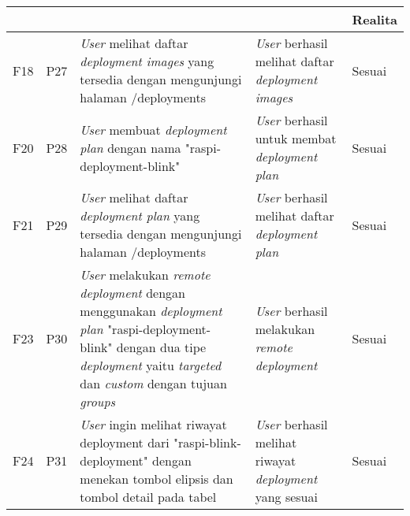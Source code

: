\bgroup
\begin{table}[ht]
  \def\arraystretch{1.3}
  \centering
  \begin{tabular}{|p{2cm}|p{2cm}|p{3cm}|p{3cm}|p{1.5cm}|}
    \hline
    \centering{ID Fungsional} & \centering{ID Pengujian} & \centering{Skenario}                                                                                                                                                                                                                  & \centering{Ekspektasi}                                                 & Realita \\
    \hline

    F18                       & P27                      & \textit{User} melihat daftar \textit{deployment images} yang tersedia dengan mengunjungi halaman /deployments                                                                                                                         & \textit{User} berhasil melihat daftar \textit{deployment images}       & Sesuai  \\
    \hline
    F20                       & P28                      & \textit{User} membuat \textit{deployment plan} dengan nama "raspi-deployment-blink"                                                                                                                                                   & \textit{User} berhasil untuk membat \textit{deployment plan}           & Sesuai  \\
    \hline
    F21                       & P29                      & \textit{User} melihat daftar \textit{deployment plan} yang tersedia dengan mengunjungi halaman /deployments                                                                                                                           & \textit{User} berhasil melihat daftar \textit{deployment plan}         & Sesuai  \\
    \hline
    F23                       & P30                      & \textit{User} melakukan \textit{remote deployment} dengan menggunakan \textit{deployment plan} "raspi-deployment-blink" dengan dua tipe \textit{deployment} yaitu \textit{targeted} dan \textit{custom} dengan tujuan \textit{groups} & \textit{User} berhasil melakukan \textit{remote deployment}            & Sesuai  \\
    \hline
    F24                       & P31                      & \textit{User} ingin melihat riwayat deployment dari "raspi-blink-deployment"                                                               dengan menekan tombol elipsis dan tombol detail pada tabel                                 & \textit{User} berhasil melihat riwayat \textit{deployment} yang sesuai & Sesuai  \\
    \hline
  \end{tabular}
\end{table}
\egroup

